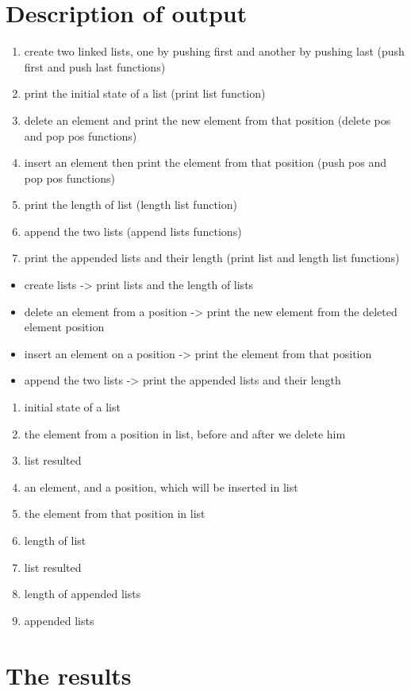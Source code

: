 \section{Description of output}
\begin{enumerate}
    \item create two linked lists, one by pushing first and another by pushing last (push first and push last functions)
    \item print the initial state of a list (print list function)
    \item delete an element and print the new element from that position (delete pos and pop pos functions)
    \item insert an element then print the element from that position (push pos and pop pos functions)
    \item print the length of list (length list function)
    \item append the two lists (append lists functions)
    \item print the appended lists and their length (print list and length list functions)
\end{enumerate}
\begin{itemize}
    \item create lists -> print lists and the length of lists
    \item delete an element from a position -> print the new element from the deleted element position
    \item insert an element on a position -> print the element from that position
    \item append the two lists -> print the appended lists and their length
\end{itemize}
\begin{enumerate}
    \item initial state of a list
    \item the element from a position in list, before and after we delete him
    \item list resulted
    \item an element, and a position, which will be inserted in list
    \item the element from that position in list
    \item length of list
    \item list resulted
    \item length of appended lists
    \item appended lists
\end{enumerate}

\section{The results}
